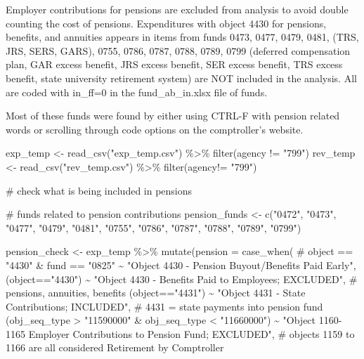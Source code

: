 \documentclass[
  letterpaper,
  DIV=11,
  numbers=noendperiod]{scrreport}
\newenvironment{Shaded}{\begin{snugshade}}{\end{snugshade}}
\newcommand{\AttributeTok}[1]{\textcolor[rgb]{0.40,0.45,0.13}{#1}}
\newcommand{\CommentTok}[1]{\textcolor[rgb]{0.37,0.37,0.37}{#1}}
\newcommand{\FunctionTok}[1]{\textcolor[rgb]{0.28,0.35,0.67}{#1}}
\newcommand{\NormalTok}[1]{\textcolor[rgb]{0.00,0.23,0.31}{#1}}
\newcommand{\OtherTok}[1]{\textcolor[rgb]{0.00,0.23,0.31}{#1}}
\newcommand{\SpecialCharTok}[1]{\textcolor[rgb]{0.37,0.37,0.37}{#1}}
\newcommand{\StringTok}[1]{\textcolor[rgb]{0.13,0.47,0.30}{#1}}
\begin{document}
Employer contributions for pensions are excluded from analysis to avoid
double counting the cost of pensions. Expenditures with object 4430 for
pensions, benefits, and annuities appears in items from funds 0473,
0477, 0479, 0481, (TRS, JRS, SERS, GARS), 0755, 0786, 0787, 0788, 0789,
0799 (deferred compensation plan, GAR excess benefit, JRS excess
benefit, SER excess benefit, TRS excess benefit, state university
retirement system) are NOT included in the analysis. All are coded with
in\_ff=0 in the fund\_ab\_in.xlsx file of funds.

Most of these funds were found by either using CTRL-F with pension
related words or scrolling through code options on the comptroller's
website.

\begin{Shaded}
\begin{Highlighting}[]
\NormalTok{exp\_temp }\OtherTok{\textless{}{-}} \FunctionTok{read\_csv}\NormalTok{(}\StringTok{"exp\_temp.csv"}\NormalTok{) }\SpecialCharTok{\%\textgreater{}\%} \FunctionTok{filter}\NormalTok{(agency }\SpecialCharTok{!=} \StringTok{"799"}\NormalTok{)}
\NormalTok{rev\_temp }\OtherTok{\textless{}{-}} \FunctionTok{read\_csv}\NormalTok{(}\StringTok{"rev\_temp.csv"}\NormalTok{) }\SpecialCharTok{\%\textgreater{}\%} \FunctionTok{filter}\NormalTok{(agency}\SpecialCharTok{!=} \StringTok{"799"}\NormalTok{)}


\CommentTok{\# check what is being included in pensions}

\CommentTok{\# funds related to pension contributions}
\NormalTok{pension\_funds }\OtherTok{\textless{}{-}} \FunctionTok{c}\NormalTok{(}\StringTok{"0472"}\NormalTok{, }\StringTok{"0473"}\NormalTok{, }\StringTok{"0477"}\NormalTok{, }\StringTok{"0479"}\NormalTok{, }\StringTok{"0481"}\NormalTok{, }\StringTok{"0755"}\NormalTok{, }\StringTok{"0786"}\NormalTok{, }\StringTok{"0787"}\NormalTok{, }\StringTok{"0788"}\NormalTok{, }\StringTok{"0789"}\NormalTok{, }\StringTok{"0799"}\NormalTok{)}

\NormalTok{pension\_check }\OtherTok{\textless{}{-}}\NormalTok{ exp\_temp }\SpecialCharTok{\%\textgreater{}\%} 
  \FunctionTok{mutate}\NormalTok{(}\AttributeTok{pension =} \FunctionTok{case\_when}\NormalTok{( }
 \CommentTok{\# object == "4430" \& fund == "0825" \textasciitilde{} "Object 4430 {-} Pension Buyout/Benefits Paid Early",}
\NormalTok{    (object}\SpecialCharTok{==}\StringTok{"4430"}\NormalTok{) }\SpecialCharTok{\textasciitilde{}} \StringTok{"Object 4430 {-} Benefits Paid to Employees; EXCLUDED"}\NormalTok{, }\CommentTok{\# pensions, annuities, benefits}
\NormalTok{    (object}\SpecialCharTok{==}\StringTok{"4431"}\NormalTok{) }\SpecialCharTok{\textasciitilde{}} \StringTok{"Object 4431 {-} State Contributions; INCLUDED"}\NormalTok{, }\CommentTok{\# 4431 = state payments into pension fund}
\NormalTok{        (obj\_seq\_type }\SpecialCharTok{\textgreater{}} \StringTok{"11590000"} \SpecialCharTok{\&}\NormalTok{ obj\_seq\_type }\SpecialCharTok{\textless{}} \StringTok{"11660000"}\NormalTok{)  }\SpecialCharTok{\textasciitilde{}} \StringTok{"Object 1160{-}1165 Employer Contributions to Pension Fund; EXCLUDED"}\NormalTok{,}
    \CommentTok{\# objects 1159 to 1166 are all considered Retirement by Comptroller }
    

\end{Highlighting}
\end{Shaded}
\end{document}
